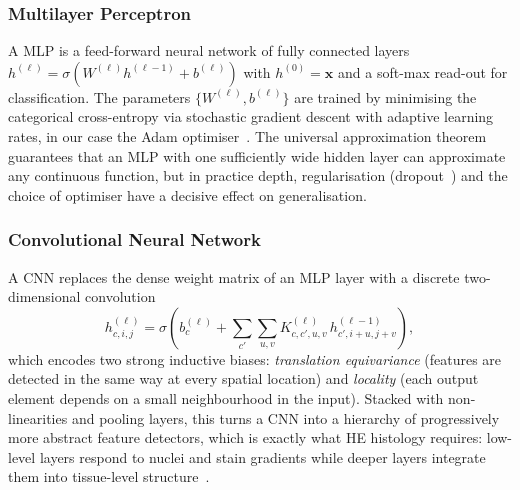\documentclass[../main.tex]{subfiles}
\begin{document}
\subsubsection{Multilayer Perceptron}
\noindent
A \gls{MLP} is a feed-forward neural network of fully connected layers
$h^{(\ell)} = \sigma\!\left(W^{(\ell)} h^{(\ell-1)} + b^{(\ell)}\right)$
with $h^{(0)} = \bm{x}$ and a soft-max read-out for classification. The
parameters $\{W^{(\ell)}, b^{(\ell)}\}$ are trained by minimising the
categorical cross-entropy via stochastic gradient descent with adaptive
learning rates, in our case the Adam optimiser~\cite{kingma2014adam}.
The universal approximation theorem~\cite{hornik1989universal} guarantees
that an \gls{MLP} with one sufficiently wide hidden layer can approximate
any continuous function, but in practice depth, regularisation
(dropout~\cite{srivastava2014dropout}) and the choice of optimiser have a
decisive effect on generalisation.

\subsubsection{Convolutional Neural Network}
\noindent
A \gls{CNN} replaces the dense weight matrix of an \gls{MLP} layer with a
discrete two-dimensional convolution
\begin{equation}
    h^{(\ell)}_{c, i, j} = \sigma\!\left(
        b^{(\ell)}_{c} +
        \sum_{c'} \sum_{u, v}
        K^{(\ell)}_{c, c', u, v}\,
        h^{(\ell-1)}_{c', i+u, j+v}
    \right),
    \label{eq.conv}
\end{equation}
which encodes two strong inductive biases: \emph{translation equivariance}
(features are detected in the same way at every spatial location) and
\emph{locality} (each output element depends on a small neighbourhood in
the input). Stacked with non-linearities and pooling layers, this turns a
\gls{CNN} into a hierarchy of progressively more abstract feature detectors,
which is exactly what \gls{HE} histology requires: low-level layers respond
to nuclei and stain gradients while deeper layers integrate them into
tissue-level structure~\cite{lecun1998cnn}.
\end{document}
